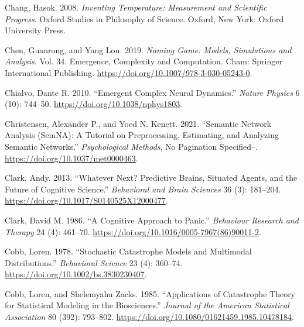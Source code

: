\documentclass[
  letterpaper,
]{scrbook}
\newlength{\cslhangindent}
\newlength{\cslentryspacingunit} %
\newenvironment{CSLReferences}[2] %
 {%
  \setlength{\parindent}{0pt}
  \ifodd #1
  \let\oldpar\par
  \def\par{\hangindent=\cslhangindent\oldpar}
  \fi
  \setlength{\parskip}{#2\cslentryspacingunit}
 }%
 {}
\begin{document}
\begin{CSLReferences}{1}{0}
\leavevmode{}%
Chang, Hasok. 2008. \emph{Inventing {Temperature}: {Measurement} and
{Scientific Progress}}. Oxford {Studies} in {Philosophy} of {Science}.
{Oxford, New York}: {Oxford University Press}.

\leavevmode{}%
Chen, Guanrong, and Yang Lou. 2019. \emph{Naming {Game}: {Models},
{Simulations} and {Analysis}}. Vol. 34. Emergence, {Complexity} and
{Computation}. {Cham}: {Springer International Publishing}.
\url{https://doi.org/10.1007/978-3-030-05243-0}.

\leavevmode{}%
Chialvo, Dante R. 2010. {``Emergent Complex Neural Dynamics.''}
\emph{Nature Physics} 6 (10): 744--50.
\url{https://doi.org/10.1038/nphys1803}.

\leavevmode{}%
Christensen, Alexander P., and Yoed N. Kenett. 2021. {``Semantic Network
Analysis ({SemNA}): {A} Tutorial on Preprocessing, Estimating, and
Analyzing Semantic Networks.''} \emph{Psychological Methods}, No
Pagination Specified--. \url{https://doi.org/10.1037/met0000463}.

\leavevmode{}%
Clark, Andy. 2013. {``Whatever Next? {Predictive} Brains, Situated
Agents, and the Future of Cognitive Science.''} \emph{Behavioral and
Brain Sciences} 36 (3): 181--204.
\url{https://doi.org/10.1017/S0140525X12000477}.

\leavevmode{}%
Clark, David M. 1986. {``A Cognitive Approach to Panic.''}
\emph{Behaviour Research and Therapy} 24 (4): 461--70.
\url{https://doi.org/10.1016/0005-7967(86)90011-2}.

\leavevmode{}%
Cobb, Loren. 1978. {``Stochastic Catastrophe Models and Multimodal
Distributions.''} \emph{Behavioral Science} 23 (4): 360--74.
\url{https://doi.org/10.1002/bs.3830230407}.

\leavevmode{}%
Cobb, Loren, and Shelemyahu Zacks. 1985. {``Applications of {Catastrophe
Theory} for {Statistical Modeling} in the {Biosciences}.''}
\emph{Journal of the American Statistical Association} 80 (392):
793--802. \url{https://doi.org/10.1080/01621459.1985.10478184}.


\end{CSLReferences}
\end{document}
